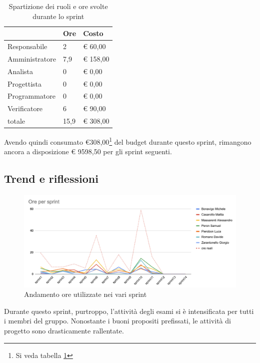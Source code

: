 \begin{table}[ht]
    \begin{tabularx}{\linewidth}{X|l|l}
    \rowcolor{gray!30}& Ore & Costo \\
    \hline
    
    Responsabile & 2 & € 60,00 \\
    \rowcolor{gray!10}Amministratore & 7,9 & € 158,00 \\
    Analista & 0 & € 0,00 \\
    \rowcolor{gray!10}Progettista & 0 & € 0,00 \\
    Programmatore & 0 & € 0,00 \\
    \rowcolor{gray!10}Verificatore & 6 &€ 90,00 \\
    totale & 15,9 & € 308,00 \\
    \end{tabularx}
    \caption{\label{costi-ruolo}Spartizione dei ruoli e ore svolte durante lo sprint}
\end{table}

Avendo quindi consumato €308,00\footnote{Si veda tabella \ref{costi-ruolo}} del budget durante questo sprint, rimangono ancora a disposizione € 9598,50 per gli sprint seguenti.

\subsection{Trend e riflessioni}\label{subsec:trend}

\begin{figure}[H]
    \includegraphics[width=\linewidth]{img/andamento.png}
    \caption{Andamento ore utilizzate nei vari sprint}\label{img:andamento}
\end{figure}

Durante questo sprint, purtroppo, l'attività degli esami si è intensificata per tutti i membri del gruppo. Nonostante i buoni propositi prefissati, le attività di progetto sono drasticamente rallentate.

